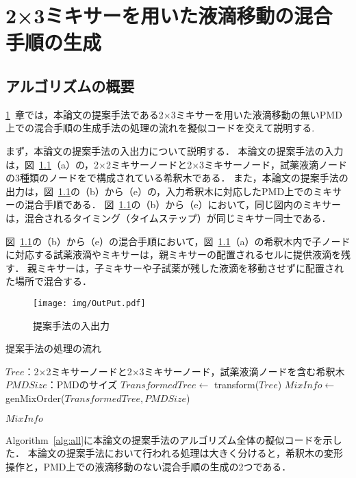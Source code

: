 \chapter{{2×3ミキサーを用いた液滴移動の混合手順の生成}}
\label{proposed}
\section{アルゴリズムの概要}
\ref{proposed}~章では，本論文の提案手法である2$\times$3ミキサーを用いた液滴移動の無いPMD上での混合手順の生成手法の処理の流れを擬似コードを交えて説明する.


まず，本論文の提案手法の入出力について説明する．
本論文の提案手法の入力は，図~\ref{fig:inputoutput}（a）の，2$\times$2ミキサーノードと2$\times$3ミキサーノード，試薬液滴ノードの3種類のノードをで構成されている希釈木である．
また，本論文の提案手法の出力は，図~\ref{fig:inputoutput}の（b）から（e）の，入力希釈木に対応したPMD上でのミキサーの混合手順である．
図~\ref{fig:inputoutput}の（b）から（e）において，同じ図内のミキサーは，混合されるタイミング（タイムステップ）が同じミキサー同士である．

図~\ref{fig:inputoutput}の（b）から（e）の混合手順において，図~\ref{fig:inputoutput}（a）の希釈木内で子ノードに対応する試薬液滴やミキサーは，親ミキサーの配置されるセルに提供液滴を残す．
親ミキサーは，子ミキサーや子試薬が残した液滴を移動させずに配置された場所で混合する．

\begin{figure}[tbp]
 \centering\texttt{[image: img/OutPut.pdf]}
 \caption{提案手法の入出力}\label{fig:inputoutput}
\end{figure}

\begin{algorithm}[tbp]
 \caption{提案手法の処理の流れ}\label{alg:all}
 \begin{algorithmic}[1]
     \Require $\mathit{Tree}$：2$\times$2ミキサーノードと2$\times$3ミキサーノード，試薬液滴ノードを含む希釈木 
     \Require $\mathit{PMDSize}$：PMDのサイズ
     \State $\mathit{TransformedTree} \gets$ transform($Tree$) \label{transform_pseudo}
     \State $\mathit{MixInfo \gets}$genMixOrder($\mathit{TransformedTree,PMDSize}$)  \label{xntm_pseudo}

      \Return $\mathit{MixInfo}$
 \end{algorithmic}
\end{algorithm}
Algorithm~\ref{alg:all}に本論文の提案手法のアルゴリズム全体の擬似コードを示した．
本論文の提案手法において行われる処理は大きく分けると，希釈木の変形操作と，PMD上での液滴移動のない混合手順の生成の2つである．

